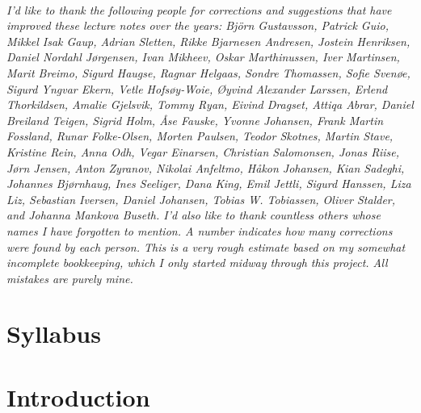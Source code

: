 \documentclass{tufte-book}
\begin{document}
\cleardoublepage
~\vfill
\begin{doublespace}
\noindent\fontsize{10}{10}\selectfont\itshape
\nohyphenation
I'd like to thank the following people for corrections and suggestions
that have improved these lecture notes over the years: Björn
Gustavsson, Patrick Guio,
Mikkel Isak Gaup, Adrian Sletten,
Rikke Bjarnesen Andresen, Jostein Henriksen, Daniel Nordahl Jørgensen,
Ivan Mikheev, Oskar Marthinussen, Iver Martinsen, Marit Breimo, Sigurd
Haugse, Ragnar Helgaas, Sondre Thomassen, Sofie Svenøe, Sigurd Yngvar
Ekern, Vetle Hofsøy-Woie, Øyvind Alexander Larssen, Erlend
Thorkildsen, Amalie Gjelsvik, Tommy Ryan, Eivind Dragset, Attiqa
Abrar, Daniel Breiland Teigen, Sigrid Holm, Åse Fauske, Yvonne
Johansen, Frank Martin Fossland, Runar Folke-Olsen, Morten Paulsen,
Teodor Skotnes,
Martin Stave, Kristine Rein, Anna Odh, Vegar
Einarsen, Christian Salomonsen, Jonas Riise, Jørn
Jensen, Anton Zyranov, Nikolai Anfeltmo, Håkon
Johansen, Kian Sadeghi, Johannes Bjørnhaug, Ines
Seeliger, Dana King, Emil Jettli, Sigurd
Hanssen, Liza Liz, Sebastian Iversen, Daniel
Johansen, Tobias W. Tobiassen, Oliver Stalder, and Johanna Mankova
Buseth. I'd also like to thank countless others whose names I
have forgotten to mention. A number indicates how many corrections were
found by each person. This is a very rough estimate based on my
somewhat incomplete bookkeeping, which I only started midway through
this project. All mistakes are purely mine.
\end{doublespace}
\vfill
\vfill





\cleardoublepage

\mainmatter
\ifSpSyllabus
\chapter{Syllabus} 

\fi


\ifSpIntro
\chapter{Introduction}

\fi
\end{document}
